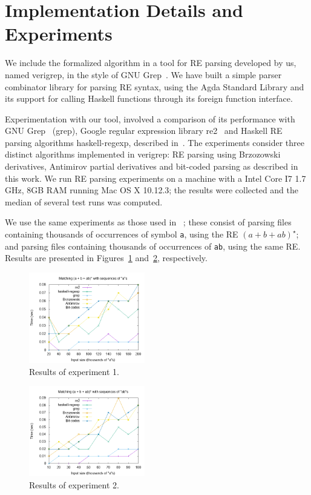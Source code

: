 \documentclass[sigplan, anonymous, review]{acmart}
\theoremstyle{definition}
\begin{document}
\section{Implementation Details and Experiments}\label{sec:exp}

We include the formalized algorithm in a tool for RE parsing 
developed by us, named verigrep, in the
style of GNU Grep~\cite{Grep}. We have built a simple parser
combinator library for parsing RE syntax, using the Agda Standard
Library and its support for calling Haskell functions through its
foreign function interface.

Experimentation with our tool, involved a comparison
of its performance with GNU Grep~\cite{Grep} (grep), Google regular
expression library re2~\cite{re2} and Haskell RE parsing algorithms
haskell-regexp, described in~\cite{Fischer2010}. The experiments consider
three distinct algorithms implemented in verigrep: RE parsing using Brzozowski 
derivatives, Antimirov partial derivatives and bit-coded parsing as described 
in this work. We run RE parsing
experiments on a machine with a Intel Core I7 1.7 GHz, 8GB RAM running
Mac OS X 10.12.3; the results were collected and the median of several
test runs was computed.

We use the same experiments as those used in ~\cite{SulzmannL14};
these consist of parsing files containing thousands of occurrences of
symbol \texttt{a}, using the RE $(a + b + ab)^\star$; and parsing
files containing thousands of occurrences of \texttt{ab}, using the
same RE. Results are presented in Figures~\ref{fig:graph1}
and~\ref{fig:graph2}, respectively.

\begin{figure}[!ht]
    \includegraphics[width=0.45\textwidth]{as.png}
   \centering
   \caption{Results of experiment 1.}
   \label{fig:graph1}
\end{figure}

\begin{figure}[!ht]
    \includegraphics[width=0.45\textwidth]{abs.png}
   \centering
   \caption{Results of experiment 2.}
   \label{fig:graph2}
\end{figure}
\end{document}
